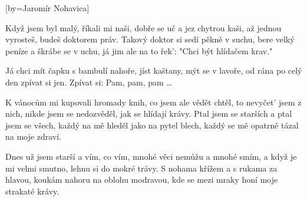 [by={Jaromír Nohavica}]

\beginverse{}
Když jsem byl malý, říkali mi naši,
dobře se uč a jez chytrou kaši,
až jednou vyrosteš, budeš doktorem práv.
Takový doktor si sedí pěkně v suchu,
bere velký peníze a škrábe se v uchu,
já jim ale na to řek': "Chci být hlídačem krav."
\endverse{}

\beginchorus{}
Já chci mít čapku s bambulí nahoře,
jíst kaštany, mýt se v lavoře,
od rána po celý den zpívat si jen.
Zpívat si: Pam, pam, pam \ldots{}
\endchorus{}

\beginverse{}
K vánocům mi kupovali hromady knih,
co jsem ale vědět chtěl, to nevyčet' jsem z nich,
nikde jsem se nedozvěděl, jak se hlídají krávy.
Ptal jsem se starších a ptal jsem se všech,
každý na mě hleděl jako na pytel blech,
každý se mě opatrně tázal na moje zdraví.
\endverse{}

\beginchorus{}
\phantom{}
\endchorus{}

\beginverse{}
Dnes už jsem starší a vím, co vím,
mnohé věci nemůžu a mnohé smím,
a když je mi velmi smutno, lehnu si do mokré trávy.
S nohama křížem a s rukama za hlavou,
koukám nahoru na oblohu modravou,
kde se mezi mraky honí moje strakaté krávy.
\endverse{}

\beginchorus{}
\phantom{}
\endchorus{}

\endsong{}
